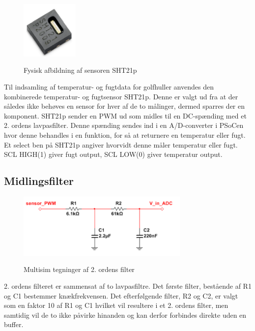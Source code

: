 
\begin{figure}[htb]
\centering
{\includegraphics[width=0.25\textwidth]{filer/design/Billeder/sht21p_fysisk}}
\caption{Fysisk afbildning af sensoren SHT21p}
\label{lab:sht_filter}
\end{figure}

Til indsamling af temperatur- og fugtdata for golfhuller anvendes den kombinerede temperatur- og fugtsensor SHT21p. Denne er valgt ud fra at der således ikke behøves en sensor for hver af de to målinger, dermed sparres der en komponent. SHT21p sender en PWM ud som midles til en DC-spænding med et 2. ordens lavpasfilter. Denne spænding sendes ind i en A/D-converter i PSoCen hvor denne behandles i en funktion, for så at returnere en temperatur eller fugt. Et select ben på SHT21p angiver hvorvidt denne måler temperatur eller fugt. SCL HIGH(1) giver fugt output, SCL LOW(0) giver temperatur output.

\subsection{Midlingsfilter}


\begin{figure}[htb]
\centering
{\includegraphics[width=0.75\textwidth]{filer/design/Billeder/sht21p_filter_pic}}
\caption{Multisim tegninger af 2. ordens filter}
\label{lab:sht_filter_pic}
\end{figure}

2. ordens filteret er sammensat af to lavpasfiltre. Det første filter, bestående af R1 og C1 bestemmer knækfrekvensen. Det efterfølgende filter, R2 og C2, er valgt som en faktor 10 af R1 og C1 hvilket vil resultere i et 2. ordens filter, men samtidig vil de to ikke påvirke hinanden og kan derfor forbindes direkte uden en buffer. 

